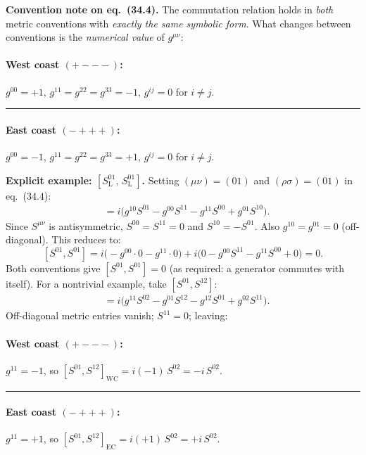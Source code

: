 \noindent\textbf{Convention note on eq.~(34.4).}
The commutation relation holds in \emph{both} metric conventions with
\emph{exactly the same symbolic form}.
What changes between conventions is the \emph{numerical value} of $g^{\mu\nu}$:

\paragraph{West coast $(+{-}{-}{-})$:} $g^{00}=+1$,\; $g^{11}=g^{22}=g^{33}=-1$,\; $g^{ij}=0$ for $i\neq j$.

\medskip\noindent\rule{\linewidth}{0.4pt}\medskip

\paragraph{East coast $(-{+}{+}{+})$:} $g^{00}=-1$,\; $g^{11}=g^{22}=g^{33}=+1$,\; $g^{ij}=0$ for $i\neq j$.

\medskip

\noindent\textbf{Explicit example: $[S^{01}_{\mathrm{L}},\, S^{01}_{\mathrm{L}}]$.}
Setting $(\mu\nu)=(01)$ and $(\rho\sigma)=(01)$ in eq.~(34.4):
\begin{align*}
  [S^{01},S^{01}]
  &= i\bigl(g^{10}S^{01} - g^{00}S^{11} - g^{11}S^{00} + g^{01}S^{10}\bigr).
\end{align*}
Since $S^{\mu\nu}$ is antisymmetric, $S^{00}=S^{11}=0$ and $S^{10}=-S^{01}$.
Also $g^{10}=g^{01}=0$ (off-diagonal). This reduces to:
\[
  [S^{01},S^{01}] = i\bigl(-g^{00}\cdot 0 - g^{11}\cdot 0\bigr)
  + i\bigl(0 - g^{00}S^{11} - g^{11}S^{00} + 0\bigr) = 0.
\]
Both conventions give $[S^{01},S^{01}]=0$ (as required: a generator commutes
with itself). For a nontrivial example, take $[S^{01},S^{12}]$:
\begin{align*}
  [S^{01},S^{12}]
  &= i\bigl(g^{11}S^{02} - g^{01}S^{12} - g^{12}S^{01} + g^{02}S^{11}\bigr).
\end{align*}
Off-diagonal metric entries vanish; $S^{11}=0$; leaving:

\paragraph{West coast $(+{-}{-}{-})$:} $g^{11}=-1$, so
$[S^{01},S^{12}]_{\mathrm{WC}} = i(-1)\,S^{02} = -i\,S^{02}$.

\medskip\noindent\rule{\linewidth}{0.4pt}\medskip

\paragraph{East coast $(-{+}{+}{+})$:} $g^{11}=+1$, so
$[S^{01},S^{12}]_{\mathrm{EC}} = i(+1)\,S^{02} = +i\,S^{02}$.

